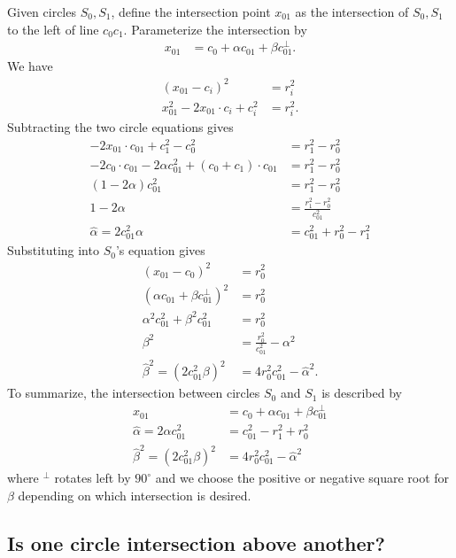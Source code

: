 \documentclass[11pt]{article}
\newcommand{\halpha}{\hat{\alpha}}
\newcommand{\hbeta}{\hat{\beta}}
\begin{document}
Given circles $S_0, S_1$, define the intersection point $x_{01}$ as the intersection
of $S_0,S_1$ to the left of line $c_0c_1$.  Parameterize the intersection by
\begin{align*}
x_{01} &= c_0 + \alpha c_{01} + \beta c_{01}^\perp.
\end{align*}
We have
\begin{align*}
(x_{01} - c_i)^2 &= r_i^2 \\
x_{01}^2 - 2x_{01} \cdot c_i + c_i^2 &= r_i^2.
\end{align*}
Subtracting the two circle equations gives
\begin{align*}
-2x_{01} \cdot c_{01} + c_1^2 - c_0^2 &= r_1^2 - r_0^2 \\
-2c_0 \cdot c_{01} -2\alpha c_{01}^2 + (c_0 + c_1) \cdot c_{01} &= r_1^2 - r_0^2 \\
(1-2\alpha) c_{01}^2 &= r_1^2 - r_0^2 \\
1 - 2 \alpha &= \frac{r_1^2 - r_0^2}{c_{01}^2} \\
\halpha = 2 c_{01}^2 \alpha &= c_{01}^2 + r_0^2 - r_1^2
\end{align*}
Substituting into $S_0$'s equation gives
\begin{align*}
(x_{01} - c_0)^2 &= r_0^2 \\
\left(\alpha c_{01} + \beta c_{01}^\perp \right)^2 &= r_0^2 \\
\alpha^2 c_{01}^2 + \beta^2 c_{01}^2 &= r_0^2 \\
\beta^2 &= \frac{r_0^2}{c_{01}^2} - \alpha^2 \\
\hbeta^2 = \left(2 c_{01}^2 \beta\right)^2 &= 4 r_0^2 c_{01}^2 - \halpha^2.
\end{align*}
To summarize, the intersection between circles $S_0$ and $S_1$ is described by
\begin{align*}
x_{01} &= c_0 + \alpha c_{01} + \beta c_{01}^\perp \\
\halpha = 2 \alpha c_{01}^2 &= c_{01}^2 - r_1^2 + r_0^2 \\
\hbeta^2 = (2c_{01}^2 \beta)^2 &= 4 r_0^2 c_{01}^2 - \halpha^2
\end{align*}
where $^\perp$ rotates left by $90^\circ$ and we choose the positive or negative square root for $\beta$ depending on which intersection is desired.

\subsection{Is one circle intersection above another?}
\end{document}
